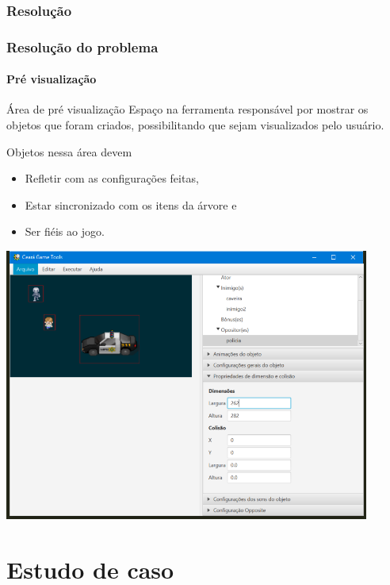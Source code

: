 \documentclass[]{beamer}
\begin{document}
   \subsubsection{Resolução}
   \begin{frame}
      \frametitle{Resolução do problema}
      \framesubtitle{Pré visualização}

      \begin{block}{Área de pré visualização}
         Espaço na ferramenta responsável por mostrar os objetos que foram criados, possibilitando que sejam visualizados pelo usuário.
      \end{block}

      \begin{block}{Objetos nessa área devem}
         \begin{itemize}
            \item Refletir com as configurações feitas,
            \item Estar sincronizado com os itens da árvore e
            \item Ser fiéis ao jogo.
         \end{itemize}
      \end{block}

   \end{frame}

   \begin{frame}
      \begin{center}
         \includegraphics[width=0.9\textwidth]{images/preview2.png}
      \end{center}
   \end{frame}

   \section{Estudo de caso}
\end{document}
